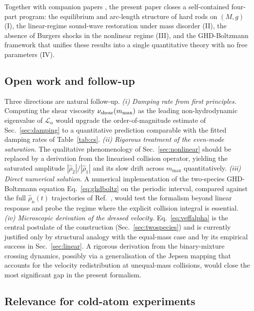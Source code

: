 \documentclass[aps,pre,twocolumn,superscriptaddress,longbibliography,floatfix]{revtex4-2}
\begin{document}
Together with companion papers
\cite{PaperI,PaperII,PaperIII}, the present paper closes a
self-contained four-part program: the equilibrium and
arc-length structure of hard rods on $(M,g)$ (I), the
linear-regime sound-wave restoration under mass disorder (II),
the absence of Burgers shocks in the nonlinear regime (III),
and the GHD-Boltzmann framework that unifies these results into
a single quantitative theory with no free parameters (IV).

\subsection{Open work and follow-up}

Three directions are natural follow-up.
\emph{(i) Damping rate from first principles.} Computing the
shear viscosity $\nu_{\rm shear}(m_{\max})$ as the leading
non-hydrodynamic eigenvalue of $\mathcal{L}_\alpha$ would
upgrade the order-of-magnitude estimate of Sec.~\ref{sec:damping}
to a quantitative prediction comparable with the fitted
damping rates of Table~\ref{tab:cs}.
\emph{(ii) Rigorous treatment of the even-mode saturation.} The
qualitative phenomenology of Sec.~\ref{sec:nonlinear} should
be replaced by a derivation from the linearised collision
operator, yielding the saturated amplitude
$|\hat\rho_2|/|\hat\rho_1|$ and its slow drift across $m_{\max}$
quantitatively.
\emph{(iii) Direct numerical solution.} A numerical
implementation of the two-species GHD-Boltzmann equation
Eq.~\eqref{eq:ghdboltz} on the periodic interval, compared
against the full $\hat\rho_n(t)$ trajectories of
Ref.~\cite{PaperIII}, would test the formalism beyond linear
response and probe the regime where the explicit collision
integral is essential.
\emph{(iv) Microscopic derivation of the dressed velocity.}
Eq.~\eqref{eq:veffalpha} is the central postulate of the
construction (Sec.~\ref{sec:twospecies}) and is currently
justified only by structural analogy with the equal-mass case
and by its empirical success in Sec.~\ref{sec:linear}. A
rigorous derivation from the binary-mixture crossing
dynamics, possibly via a generalisation of the Jepsen mapping
that accounts for the velocity redistribution at unequal-mass
collisions, would close the most significant gap in the
present formalism.

\subsection{Relevance for cold-atom experiments}
\end{document}
